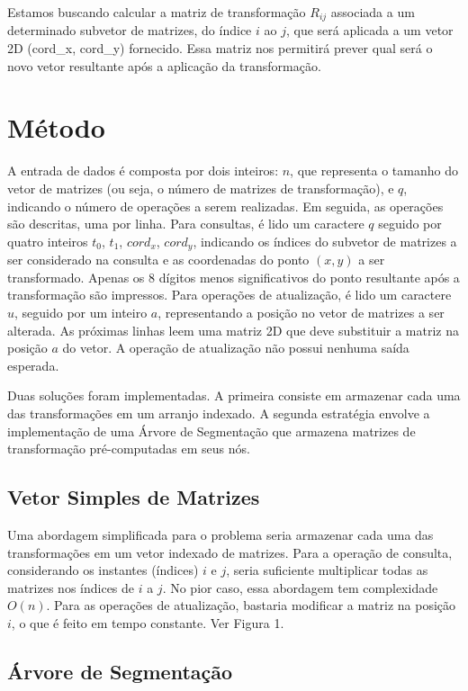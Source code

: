 \documentclass{article}
\begin{document}
Estamos buscando calcular a matriz de transformação  \(R_{ij}\)  associada a um determinado subvetor de matrizes, do índice \(i\) ao \(j\),  que será aplicada a um vetor 2D (cord\_x, cord\_y) fornecido. Essa matriz nos permitirá prever qual será o novo vetor resultante após a aplicação da transformação.


\section{Método}

A entrada de dados é composta por dois inteiros: $n$, que representa o tamanho do vetor de matrizes (ou seja, o número de matrizes de transformação), e $q$, indicando o número de operações a serem realizadas. Em seguida, as operações são descritas, uma por linha. Para consultas, é lido um caractere $q$ seguido por quatro inteiros $t_0$, $t_1$, $cord_x$, $cord_y$, indicando os índices do subvetor de matrizes a ser considerado na consulta e as coordenadas do ponto $(x, y)$ a ser transformado. Apenas os 8 dígitos menos significativos do ponto resultante após a transformação são impressos. Para operações de atualização, é lido um caractere $u$, seguido por um inteiro $a$, representando a posição no vetor de matrizes a ser alterada. As próximas linhas leem uma matriz 2D que deve substituir a matriz na posição $a$ do vetor. A operação de atualização não possui nenhuma saída esperada.

Duas soluções foram implementadas. A primeira consiste em armazenar cada uma das transformações em um arranjo indexado.  A segunda estratégia envolve a implementação de uma Árvore de Segmentação que armazena matrizes de transformação pré-computadas em seus nós.


\subsection{Vetor Simples de Matrizes}

Uma abordagem simplificada para o problema seria armazenar cada uma das transformações em um vetor indexado de matrizes. Para a operação de consulta, considerando os instantes (índices) $i$ e $j$, seria suficiente multiplicar todas as matrizes nos índices de $i$ a $j$. No pior caso, essa abordagem tem complexidade $O(n)$. Para as operações de atualização, bastaria modificar a matriz na posição $i$, o que é feito em tempo constante. Ver Figura 1.


\subsection{Árvore de Segmentação}
\end{document}
